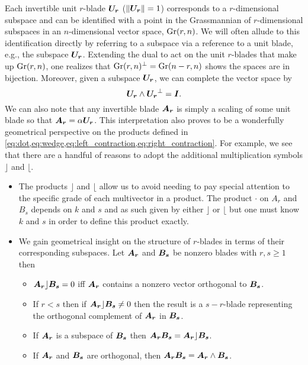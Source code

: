 Each invertible unit $r$-blade $\boldsymbol{U_r}$ ($\|\boldsymbol{U_r}\|=1$) corresponds to a $r$-dimensional subspace and can be identified with a point in the Grassmannian of $r$-dimensional subspaces in an $n$-dimensional vector space, $\operatorname{Gr}(r,n)$. We will often allude to this identification directly by referring to a subspace via a reference to a unit blade, e.g., the subspace $\boldsymbol{U_r}$. Extending the dual to act on the unit $r$-blades that make up $\operatorname{Gr}(r,n)$, one realizes that $\operatorname{Gr}(r,n)^\perp = \operatorname{Gr}(n-r,n)$ shows the spaces are in bijection. Moreover, given a subspace $\boldsymbol{U_r}$, we can complete the vector space by
\begin{equation}
\boldsymbol{U_r}\wedge \boldsymbol{U_r}^\perp = \boldsymbol{I}.
\end{equation} 
We can also note that any invertible blade $\boldsymbol{A_r}$ is simply a scaling of some unit blade so that $\boldsymbol{A_r} = \alpha \boldsymbol{U_r}$. This interpretation also proves to be a wonderfully geometrical perspective on the products defined in \cref{eq:dot,eq:wedge,eq:left_contraction,eq:right_contraction}. For example, we see that there are a handful of reasons to adopt the additional multiplication symbols $\rfloor$ and $\lfloor$. 
\begin{itemize}
    \item The products $\rfloor$ and $\lfloor$ allow us to avoid needing to pay special attention to the specific grade of each multivector in a product. The product $\cdot$ on $A_r$ and $B_s$ depends on $k$ and $s$ and as such given by either $\rfloor$ or $\lfloor$ but one must know $k$ and $s$ in order to define this product exactly. 
    \item We gain geometrical insight on the structure of $r$-blades in terms of their corresponding subspaces. Let $\boldsymbol{A_r}$ and $\boldsymbol{B_s}$ be nonzero blades with $r,s\geq 1$ then
    \begin{itemize}
        \item $\boldsymbol{A_r} \rfloor \boldsymbol{B_s} =0$ iff $\boldsymbol{A_r}$ contains a nonzero vector orthogonal to $\boldsymbol{B_s}$.
        \item If $r<s$ then if $\boldsymbol{A_r}\rfloor \boldsymbol{B_s} \neq 0$ then the result is a $s-r$-blade representing the orthogonal complement of $\boldsymbol{A_r}$ in $\boldsymbol{B_s}$.
        \item If $\boldsymbol{A_r}$ is a subspace of $\boldsymbol{B_s}$ then $\boldsymbol{A_r}\boldsymbol{B_s} = \boldsymbol{A_r}\rfloor \boldsymbol{B_s}$.
        \item If $\boldsymbol{A_r}$ and $\boldsymbol{B_s}$ are orthogonal, then $\boldsymbol{A_r}\boldsymbol{B_s} = \boldsymbol{A_r} \wedge \boldsymbol{B_s}$.
    \end{itemize}
\end{itemize}

